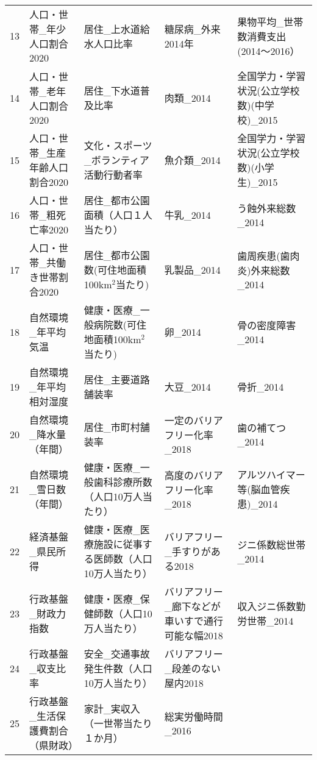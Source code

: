 \begin{table}[ht]
\begin{adjustbox}{width=1.5\textwidth}
\begin{tabular}{rllll}
  13 & 人口・世帯\_年少人口割合2020 & 居住\_上水道給水人口比率 & 糖尿病\_外来2014年 & 果物平均\_世帯数消費支出(2014〜2016） \\
  14 & 人口・世帯\_老年人口割合2020 & 居住\_下水道普及比率 & 肉類\_2014 & 全国学力・学習状況(公立学校数)(中学校)\_2015 \\
  15 & 人口・世帯\_生産年齢人口割合2020 & 文化・スポーツ\_ボランティア活動行動者率 & 魚介類\_2014 & 全国学力・学習状況(公立学校数)(小学生)\_2015 \\
  16 & 人口・世帯\_粗死亡率2020 & 居住\_都市公園面積（人口１人当たり） & 牛乳\_2014 & う蝕外来総数\_2014 \\
  17 & 人口・世帯\_共働き世帯割合2020 & 居住\_都市公園数(可住地面積100km$^2$当たり) & 乳製品\_2014 & 歯周疾患(歯肉炎)外来総数\_2014 \\
  18 & 自然環境\_年平均気温 & 健康・医療\_一般病院数(可住地面積100km$^2$当たり) & 卵\_2014 & 骨の密度障害\_2014 \\
  19 & 自然環境\_年平均相対湿度 & 居住\_主要道路舗装率 & 大豆\_2014 & 骨折\_2014 \\
  20 & 自然環境\_降水量（年間） & 居住\_市町村舗装率 & 一定のバリアフリー化率\_2018 & 歯の補てつ\_2014 \\
  21 & 自然環境\_雪日数（年間） & 健康・医療\_一般歯科診療所数（人口10万人当たり） & 高度のバリアフリー化率\_2018 & アルツハイマー等(脳血管疾患)\_2014 \\
  22 & 経済基盤\_県民所得 & 健康・医療\_医療施設に従事する医師数（人口10万人当たり） & バリアフリー\_手すりがある2018 & ジニ係数総世帯\_2014 \\
  23 & 行政基盤\_財政力指数 & 健康・医療\_保健師数（人口10万人当たり） & バリアフリー\_廊下などが車いすで通行可能な幅2018 & 収入ジニ係数勤労世帯\_2014 \\
  24 & 行政基盤\_収支比率 & 安全\_交通事故発生件数（人口10万人当たり） & バリアフリー\_段差のない屋内2018 &  \\
  25 & 行政基盤\_生活保護費割合（県財政） & 家計\_実収入（一世帯当たり１か月） & 総実労働時間\_2016 &  \\
   \hline
\end{tabular}
\end{adjustbox}

\endgroup
\end{table}
